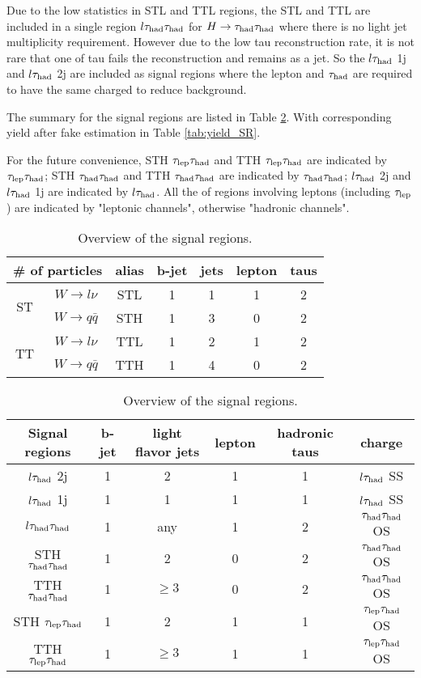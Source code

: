 Due to the low statistics in STL and TTL regions, the STL and TTL are included in a single region $l\tau_\text{had}{}\tau_\text{had}$ for $H\to\tau_\text{had}{}\tau_\text{had}$ where there is no light jet multiplicity requirement. However due to the low tau reconstruction rate, it is not rare that one of tau fails the reconstruction and remains as a jet. So the $l\tau_\text{had}$ 1j and $l\tau_\text{had}$ 2j are included as signal regions where the lepton and $\tau_\text{had}$ are required to have the same charged to reduce background.

The summary for the signal regions are listed in Table \ref{tab:signalregions}. With corresponding yield after fake estimation in Table \ref{tab:yield_SR}.

For the future convenience, STH $\tau_\text{lep}{}\tau_\text{had}$ and TTH $\tau_\text{lep}{}\tau_\text{had}$ are indicated by $\tau_\text{lep}{}\tau_\text{had}$; STH $\tau_\text{had}{}\tau_\text{had}$ and TTH $\tau_\text{had}{}\tau_\text{had}$ are indicated by $\tau_\text{had}{}\tau_\text{had}$; $l\tau_\text{had}$ 2j and $l\tau_\text{had}$ 1j are indicated by $l\tau_\text{had}$. All the of regions involving leptons (including $\tau_\text{lep}$) are indicated by "leptonic channels", otherwise "hadronic channels".

\begin{table}
\footnotesize
\centering
\caption{Overview of the final states of signal events.}
\label{tab:signalevents}
\begin{tabular}[h]{c|c|c|c|c|c|c}
\hline \hline

\multicolumn{2}{c|}{\# of particles}	& alias & b-jet & jets & lepton & taus\\ \hline
\multirow{2}{*}{ST}	& $W\to l\nu$		& STL   & 1	    & 1    & 1      & 2   \\ \cline{2-7}
					& $W\to q\bar{q}$	& STH   & 1	    & 3    & 0      & 2   \\ \hline
\multirow{2}{*}{TT}	& $W\to l\nu$		& TTL   & 1	    & 2    & 1      & 2   \\ \cline{2-7}
					& $W\to q\bar{q}$	& TTH   & 1	    & 4    & 0      & 2   \\ \hline
\end{tabular}
\footnotesize
\centering
\caption{Overview of the signal regions.}
\label{tab:signalregions}
\begin{tabular}[h]{c|c|c|c|c|c}
\hline \hline
Signal regions & b-jet & light flavor jets	& lepton & hadronic taus & charge\\ \hline
$l\tau_\text{had}$ 2j  & 1     & 2					& 1      & 1			 & $l\tau_\text{had}$ SS\\ \hline
$l\tau_\text{had}$ 1j  & 1     & 1					& 1      & 1			 & $l\tau_\text{had}$ SS\\ \hline
$l\tau_\text{had}{}\tau_\text{had}$	   & 1     & any				& 1      & 2             & $\tau_\text{had}{}\tau_\text{had}$ OS\\ \hline
STH $\tau_\text{had}{}\tau_\text{had}$ & 1     & 2      			& 0      & 2             & $\tau_\text{had}{}\tau_\text{had}$ OS\\ \hline
TTH $\tau_\text{had}{}\tau_\text{had}$ & 1     & $\ge3$ 			& 0      & 2             & $\tau_\text{had}{}\tau_\text{had}$ OS\\ \hline
STH $\tau_\text{lep}{}\tau_\text{had}$   & 1     & 2      			& 1      & 1             & $\tau_\text{lep}{}\tau_\text{had}$ OS\\ \hline
TTH $\tau_\text{lep}{}\tau_\text{had}$   & 1     & $\ge3$ 			& 1      & 1             & $\tau_\text{lep}{}\tau_\text{had}$ OS\\ \hline
\end{tabular}
\end{table}

